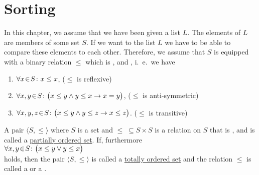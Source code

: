 \chapter{Sorting}
In this chapter, we assume that we have been given a list $L$.  The elements of $L$ are members of
some set $S$.  If we want to  the list $L$ we have to be able to compare these elements
to each other.   Therefore, we assume that $S$ is equipped with a binary relation $\leq$ which is
,  and , i.~e.~we have  
\begin{enumerate}
\item $\forall x \!\in\! S \colon x \leq x$,                      \hspace*{\fill} ($\leq$ is reflexive)
\item $\forall x, y \!\in\! S \colon \bigl(x \leq y \wedge y \leq x
  \rightarrow x = y\bigr)$,   \hspace*{\fill} ($\leq$ is anti-symmetric)
\item $\forall x, y, z \!\in\! S \colon \bigl(x \leq y \wedge y \leq z \rightarrow x \leq z\bigr)$.  \hspace*{\fill} ($\leq$ is transitive)
\end{enumerate}
A pair $\langle S, \leq \rangle$ where $S$ is a set and $\leq \;\subseteq S \times S$ is a relation
on $S$ that is ,  and  is called a
\href{http://en.wikipedia.org/wiki/Partially_ordered_set}{partially ordered set}.  
If, furthermore
\\[0.2cm]
\hspace*{1.3cm}
$\forall x, y \!\in\! S \colon\bigl( x \leq y \vee y \leq x\bigr)$
\\[0.2cm]
holds, then the pair $\langle S, \leq \rangle$ is called a 
\href{http://en.wikipedia.org/wiki/Totally_ordered_set}{totally ordered set} and
the relation $\leq$ is called a  or a .

